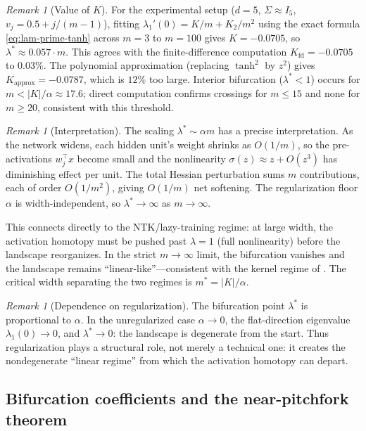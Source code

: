\documentclass[11pt, reqno]{amsart}
\theoremstyle{plain}
\theoremstyle{definition}
\theoremstyle{remark}
\newtheorem{remark}[theorem]{Remark}
\begin{document}
\begin{remark}[Value of $K$]\label{rem:K-value}
For the experimental setup ($d=5$, $\Sigma\approx I_5$, $v_j=0.5+j/(m-1)$), fitting $\lambda_1'(0)=K/m+K_2/m^2$ using the exact formula \eqref{eq:lam-prime-tanh} across $m=3$ to $m=100$ gives $K=-0.0705$, so $\lambda^*\approx 0.057\cdot m$. This agrees with the finite-difference computation $K_{\text{fd}}=-0.0705$ to $0.03\%$. The polynomial approximation (replacing $\tanh^2$ by $z^2$) gives $K_{\text{approx}}=-0.0787$, which is $12\%$ too large. Interior bifurcation ($\lambda^*<1$) occurs for $m<|K|/\alpha\approx 17.6$; direct computation confirms crossings for $m\le 15$ and none for $m\ge 20$, consistent with this threshold.
\end{remark}

\begin{remark}[Interpretation]
The scaling $\lambda^*\sim\alpha m$ has a precise interpretation.  As the network widens, each hidden unit's weight shrinks as $O(1/m)$, so the pre-activations $w_j^\top x$ become small and the nonlinearity $\sigma(z)\approx z+O(z^3)$ has diminishing effect per unit.  The total Hessian perturbation sums $m$ contributions, each of order $O(1/m^2)$, giving $O(1/m)$ net softening.  The regularization floor $\alpha$ is width-independent, so $\lambda^*\to\infty$ as $m\to\infty$.

This connects directly to the NTK/lazy-training regime: at large width, the activation homotopy must be pushed past $\lambda=1$ (full nonlinearity) before the landscape reorganizes.  In the strict $m\to\infty$ limit, the bifurcation vanishes and the landscape remains ``linear-like''---consistent with the kernel regime of \cite{jacot2018}.  The critical width separating the two regimes is $m^*=|K|/\alpha$.
\end{remark}

\begin{remark}[Dependence on regularization]
The bifurcation point $\lambda^*$ is proportional to $\alpha$.  In the unregularized case $\alpha\to 0$, the flat-direction eigenvalue $\lambda_1(0)\to 0$, and $\lambda^*\to 0$: the landscape is degenerate from the start.  Thus regularization plays a structural role, not merely a technical one: it creates the nondegenerate ``linear regime'' from which the activation homotopy can depart.
\end{remark}

\subsection{Bifurcation coefficients and the near-pitchfork theorem}\label{ssec:bif-coefficients}
\end{document}
